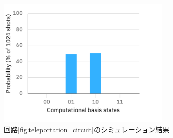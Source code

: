 \begin{frame}
\begin{itemize}
\begin{columns}
\begin{column}{0.6\textwidth}
        \pause
      \end{column}
      \begin{column}{0.4\textwidth}
        \begin{figure}
          \includegraphics[width=0.8\textwidth]{./img/cz_teleportation_histogram.pdf}
          \caption{回路\ref{fig:teleportation_circuit}のシミュレーション結果}
        \end{figure}
      \end{column}
    \end{columns}
  \end{itemize}
\end{frame}

